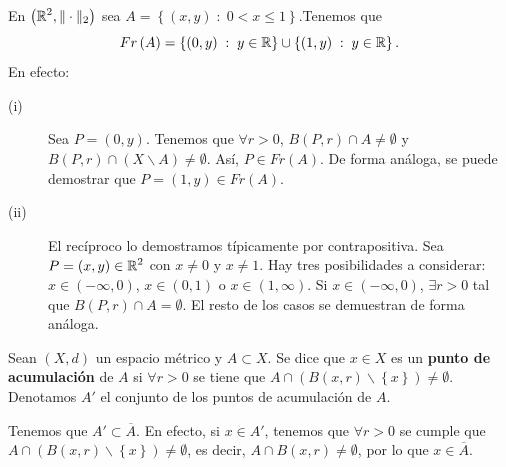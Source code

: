\begin{eg}
	En $\displaystyle \left(\mathbb{R}^{2}, \| \cdot \|_{2}\right) $ sea $\displaystyle A = \left\{ \left(x,y\right) \; : \; 0 < x \leq 1\right\}  $.Tenemos que  
	\[ Fr\left(A\right) = \left\{ \left(0,y\right)\; : \; y \in \mathbb{R}\right\} \cup \left\{ \left(1,y\right) \; : \; y \in \mathbb{R}\right\} .\]
	En efecto:
	\begin{description}
	\item[(i)] Sea $\displaystyle P = \left(0,y\right) $. Tenemos que $\displaystyle \forall r > 0 $, $\displaystyle B\left(P,r\right) \cap A \neq \emptyset $ y $\displaystyle B\left(P,r\right)\cap \left(X\backslash A\right) \neq \emptyset $. Así, $\displaystyle P \in Fr\left(A\right) $. De forma análoga, se puede demostrar que $\displaystyle P = \left(1,y\right) \in Fr\left(A\right) $.
	\item[(ii)] El recíproco lo demostramos típicamente por contrapositiva. Sea $\displaystyle P = \left(x,y\right) \in \mathbb{R}^{2} $ con $\displaystyle x \neq 0 $ y $\displaystyle x \neq 1 $. Hay tres posibilidades a considerar: $\displaystyle x \in \left(-\infty, 0\right) $, $\displaystyle x \in \left(0,1\right) $ o $\displaystyle x \in \left(1,\infty\right) $. Si $\displaystyle x \in \left(-\infty, 0\right) $, $\displaystyle \exists r > 0 $ tal que $\displaystyle B\left(P,r\right) \cap A = \emptyset $. El resto de los casos se demuestran de forma análoga.
	\end{description}
\end{eg}
\begin{definition}
	Sean $\displaystyle \left(X,d\right) $ un espacio métrico y $\displaystyle A \subset X $. Se dice que $\displaystyle x \in X $ es un \textbf{punto de acumulación} de $\displaystyle A $ si $\displaystyle \forall r> 0 $ se tiene que $\displaystyle A \cap \left(B\left(x,r\right)\backslash \left\{ x\right\} \right)\neq \emptyset $. Denotamos $\displaystyle A' $ el conjunto de los puntos de acumulación de $\displaystyle A $.
\end{definition}
\begin{observation}
	Tenemos que $\displaystyle A' \subset \overline{A} $. En efecto, si $\displaystyle x \in A' $, tenemos que $\displaystyle \forall r > 0 $ se cumple que $\displaystyle A \cap \left(B\left(x,r\right) \backslash \left\{ x\right\} \right) \neq \emptyset $, es decir, $\displaystyle A \cap B\left(x,r\right) \neq \emptyset $, por lo que $\displaystyle x \in \overline{A} $.
\end{observation}
